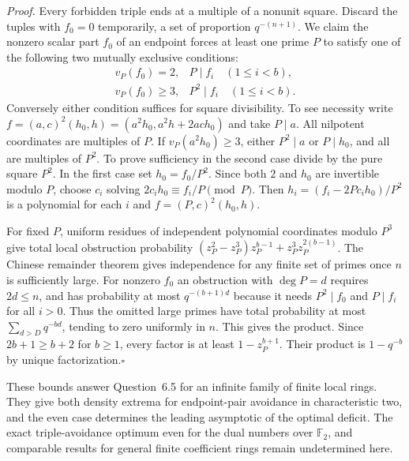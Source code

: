 \smallskip\noindent\emph{Proof.}
Every forbidden triple ends at a multiple of a nonunit square. Discard
the tuples with $f_0=0$ temporarily, a set of proportion $q^{-(n+1)}$.
We claim the nonzero scalar part $f_0$ of an endpoint forces at least one
prime $P$ to satisfy one of the following two mutually exclusive conditions:
\[
\begin{array}{ll}
 v_P(f_0)=2, &P\mid f_i\quad(1\le i<b),\\
 v_P(f_0)\ge3, &P^2\mid f_i\quad(1\le i<b).
\end{array}
\]
Conversely either condition suffices for square divisibility. To see
necessity write $f=(a,c)^2(h_0,h)=(a^2h_0,a^2h+2ach_0)$
and take $P\mid a$. All nilpotent coordinates are multiples of $P$.
If $v_P(a^2 h_0)\ge3$, either $P^2\mid a$ or $P\mid h_0$,
and all are multiples of $P^2$. To prove sufficiency in the second
case divide by the pure square $P^2$. In the first case set
$h_0=f_0/P^2$. Since both $2$ and $h_0$ are invertible modulo $P$,
choose $c_i$ solving $2c_i h_0\equiv f_i/P\pmod P$. Then
$h_i=(f_i-2Pc_i h_0)/P^2$ is a polynomial for each $i$ and
$f=(P,c)^2(h_0,h)$.

For fixed $P$, uniform residues of independent polynomial coordinates
modulo $P^3$ give total local obstruction probability
$(z_P^2-z_P^3)z_P^{b-1}+z_P^3 z_P^{2(b-1)}$.
The Chinese remainder theorem gives independence for any finite set of
primes once $n$ is sufficiently large. For nonzero $f_0$ an obstruction
with $\deg P=d$ requires $2d\le n$, and has probability at most
$q^{-(b+1)d}$ because it needs $P^2\mid f_0$ and $P\mid f_i$ for all
$i>0$. Thus the omitted large primes have total probability at most
$\sum_{d>D} q^{-bd}$, tending to zero uniformly in $n$.
This gives the product. Since $2b+1\ge b+2$ for $b\ge1$, every
factor is at least $1-z_P^{b+1}$. Their product is $1-q^{-b}$ by
unique factorization.\hfill$\square$

These bounds answer Question~6.5 for an infinite family of finite local
rings. They give both density extrema for endpoint-pair avoidance in characteristic two, and the even
case determines the leading asymptotic of the optimal deficit. The
exact triple-avoidance optimum even for the dual numbers over
$\mathbb F_2$, and comparable results for general finite coefficient
rings remain undetermined here.
